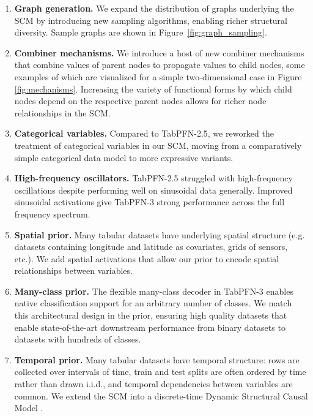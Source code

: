 \begin{enumerate}
    \item \textbf{Graph generation.} We expand the distribution of graphs
    underlying the SCM by introducing new sampling algorithms, enabling
    richer structural diversity. Sample graphs are shown in
    Figure~\ref{fig:graph_sampling}.
    
    \item \textbf{Combiner mechanisms.} We introduce a host of new combiner mechanisms that combine values of parent nodes to propagate values to child nodes, some examples of which are visualized for a simple two-dimensional case in Figure \ref{fig:mechanisms}. Increasing the variety of functional forms by which child nodes depend on the respective parent nodes allows for richer node relationships in the SCM.
    
    
    \item \textbf{Categorical variables.} Compared to TabPFN-2.5, we reworked the treatment of categorical variables in our SCM, moving from a comparatively simple categorical data model to more expressive variants.    
    
    
    \item \textbf{High-frequency oscillators.} TabPFN-2.5 struggled with
    high-frequency oscillations despite performing well on sinusoidal data
    generally. Improved sinusoidal activations give TabPFN-3 strong
    performance across the full frequency spectrum.
    
    \item \textbf{Spatial prior.} Many tabular datasets have underlying spatial structure (e.g. datasets containing longitude and latitude as covariates, grids of sensors, etc.). We add spatial activations that allow our prior to encode spatial relationships between variables. %
    
    \item \textbf{Many-class prior.} The flexible many-class decoder in TabPFN-3 enables native classification support for an arbitrary number of classes. We match this architectural design in the prior, ensuring high quality datasets that enable state-of-the-art downstream performance from binary datasets to datasets with hundreds of classes.

    \item \textbf{Temporal prior.} Many tabular datasets have temporal structure: rows are collected over intervals of time, train and test splits are often ordered by time rather than drawn i.i.d., and temporal dependencies between variables are common. We extend the SCM into a discrete-time Dynamic Structural Causal Model \citep{boeken2024dynamicstructuralcausalmodels}. 


\end{enumerate}
